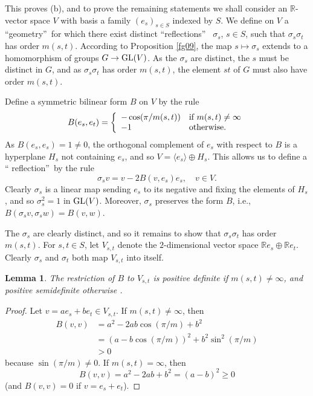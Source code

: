 \documentclass[a4paper,11pt,final]{memoir}%
\newtheorem{lemma}[X]{Lemma}
\theoremstyle{nonumberplain}
\newtheorem{proof}{Proof.}
\begin{document}
This proves (b), and to prove the remaining statements we shall consider an
$\mathbb{R}{}$-vector space $V$ with basis a family $(e_{s})_{s\in S}$ indexed
by $S$. We define on $V$ a \textquotedblleft geometry\textquotedblright\ for
which there exist distinct \textquotedblleft reflections\textquotedblright%
\ $\sigma_{s}$, $s\in S$, such that $\sigma_{s}\sigma_{t}$ has order $m(s,t)$.
According to Proposition \ref{fg09}, the map $s\mapsto\sigma_{s}$ extends to a
homomorphism of groups $G\rightarrow\operatorname{GL}(V)$. As the $\sigma_{s}$ are distinct,
the $s$ must be distinct in $G$, and as $\sigma_{s}\sigma_{t}$ has order
$m(s,t)$, the element $st$ of $G$ must also have order $m(s,t)$.

Define a symmetric bilinear form $B$ on $V$ by the rule%
\[
B(e_{s},e_{t})=\left\{
\begin{array}
[c]{ll}%
-\cos(\pi/m(s,t)) & \text{if }m(s,t)\neq\infty\\
-1 & \text{otherwise.}%
\end{array}
\right.
\]
As $B(e_{s},e_{s})=1\neq0$, the orthogonal complement of $e_{s}$ with respect
to $B$ is a hyperplane $H_{s}$ not containing $e_{s}$, and so $V=\langle
e_{s}\rangle\oplus H_{s}$. This allows us to define a \textquotedblleft
reflection\textquotedblright\ by the rule%
\[
\sigma_{s}v=v-2B(v,e_{s})e_{s},\quad v\in V.
\]
Clearly $\sigma_{s}$ is a linear map sending $e_{s}$ to its negative and
fixing the elements of $H_{s}$, and so $\sigma_{s}^{2}=1$ in $\operatorname{GL}(V)$.
Moreover, $\sigma_{s}$ preserves the form $B$, i.e., $B(\sigma_{s}v,\sigma
_{s}w)=B(v,w)$.

The $\sigma_{s}$ are clearly distinct, and so it remains to show that
$\sigma_{s}\sigma_{t}$ has order $m(s,t)$. For $s,t\in S$, let $V_{s,t}$
denote the $2$-dimensional vector space $\mathbb{R}{}e_{s}\oplus\mathbb{R}%
{}e_{t}$. Clearly $\sigma_{s}$ and $\sigma_{t}$ both map $V_{s,t}$ into itself.

\begin{lemma}
\label{fg17}The restriction of $B$ to $V_{s,t}$ is positive definite if
$m(s,t)\neq\infty$, and positive semidefinite otherwise .
\end{lemma}

\begin{proof}
Let $v=ae_{s}+be_{t}\in V_{s,t}$. If $m(s,t)\neq\infty$, then%
\begin{align*}
B(v,v)  &  =a^{2}-2ab\cos(\pi/m)+b^{2}\\
&  =(a-b\cos(\pi/m))^{2}+b^{2}\sin^{2}(\pi/m)\\
&  >0
\end{align*}
because $\sin(\pi/m)\neq0$. If $m(s,t)=\infty$, then%
\[
B(v,v)=a^{2}-2ab+b^{2}=(a-b)^{2}\geq0
\]
(and $B(v,v)=0$ if $v=e_{s}+e_{t}$).
\end{proof}
\end{document}

